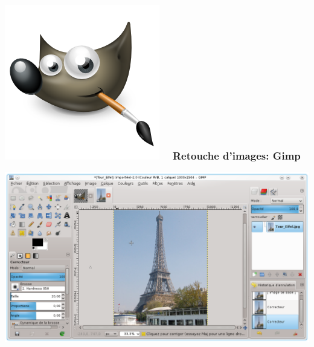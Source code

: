 \documentclass{beamer}
\begin{document}
\begin{frame}
\frametitle{\includegraphics[scale=0.2] {./images/gimp.png} ~ Retouche d'images: Gimp}
\begin{center}
\includegraphics[scale=0.4] {./images/The_Gimp_in_action.png} 
\end{center}
\end{frame}
\end{document}
